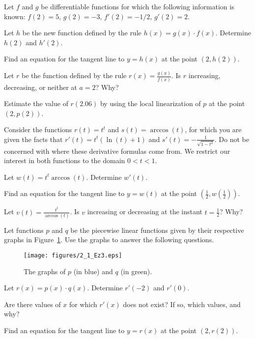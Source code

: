 \begin{exercises} 
\item Let $f$ and $g$ be differentiable functions for which the following information is known:  $f(2) = 5$, $g(2) = -3$, $f'(2) = -1/2$, $g'(2) = 2$.
\ba
	\item Let $h$ be the new function defined by the rule $h(x) = g(x) \cdot f(x)$.  Determine $h(2)$ and $h'(2)$.
	\item Find an equation for the tangent line to $y = h(x)$ at the point $(2,h(2))$.
	\item Let $r$ be the function defined by the rule $r(x) = \frac{g(x)}{f(x)}$.  Is $r$ increasing, decreasing, or neither at $a = 2$?  Why?
	\item Estimate the value of $r(2.06)$ by using the local linearization of $p$ at the point $(2,p(2))$.
\ea
\begin{exerciseSolution}
\end{exerciseSolution}
\item Consider the functions $r(t) = t^t$ and $s(t) = \arccos(t)$, for which you are given the facts that $r'(t) = t^t(\ln(t) + 1)$ and $s'(t) = -\frac{1}{\sqrt{1-t^2}}$.  Do not be concerned with where these derivative formulas come from.  We restrict our interest in both functions to the domain $0 < t < 1$.
\ba
	\item Let $w(t) = t^t \arccos(t)$.  Determine $w'(t)$.
	\item Find an equation for the tangent line to $y = w(t)$ at the point $(\frac{1}{2}, w(\frac{1}{2}))$.
	\item Let $v(t) = \frac{t^t}{\arccos(t)}$.  Is $v$ increasing or decreasing at the instant $t = \frac{1}{2}$?  Why?
\ea
\item Let functions $p$ and $q$ be the piecewise linear functions given by their respective graphs in Figure~\ref{F:2.3.Ez3}.  Use the graphs to answer the following questions.
\begin{figure}[h]
\begin{center}
\texttt{[image: figures/2\_1\_Ez3.eps]}
\caption{The graphs of $p$ (in blue) and $q$ (in green).} \label{F:2.3.Ez3}
\end{center}
\end{figure}
\ba
	\item Let $r(x) = p(x) \cdot q(x)$.  Determine $r'(-2)$ and $r'(0)$.
	\item Are there values of $x$ for which $r'(x)$ does not exist?  If so, which values, and why?
	\item Find an equation for the tangent line to $y = r(x)$ at the point $(2,r(2))$.

\end{exercises}
